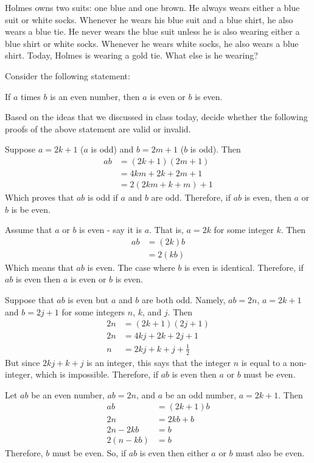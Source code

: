 \documentclass[11pt]{exam}
\begin{document}
\begin{center}
Holmes owns two suits: one blue and one brown.  He always wears either a blue suit or white socks.  Whenever he wears his blue suit and a blue shirt, he also wears a blue tie.  He never wears the blue suit unless he is also wearing either a blue shirt or white socks.  Whenever he wears white socks, he also wears a blue shirt.  Today, Holmes is wearing a gold tie.  What else is he wearing?
\end{center}
\newpage
Consider the following statement: 
\begin{center}
If $a$ times $b$ is an even number, then $a$ is even or $b$ is even.
\end{center}
Based on the ideas that we discussed in class today, decide whether the following proofs of the above statement are valid or invalid.
\begin{questions}
\question
Suppose $a=2k+1$ ($a$ is odd) and $b=2m+1$ ($b$ is odd). Then 
\begin{align*} 
ab &=(2k+1)(2m+1)\\
&=4km+2k+2m+1\\
&=2(2km+k+m)+1
\end{align*}
Which proves that $ab$ is odd if $a$ and $b$ are odd. Therefore, if $ab$ is even, then $a$ or $b$ is be even.
\vfill

\question
Assume that $a$ or $b$ is even - say it is $a$. That is, $a=2k$ for some integer $k$. Then 
\begin{align*} 
ab &=(2k)b\\
&=2(kb)
\end{align*} 
Which means that $ab$ is even.  The case where $b$ is even is identical.  Therefore, if $ab$ is even then $a$ is even or $b$ is even.
\vfill

\question
Suppose that $ab$ is even but $a$ and $b$ are both odd. Namely, $ab = 2n$, $a=2k+1$ and $b=2j+1$ for some integers $n$, $k$, and $j$. Then 
\begin{align*} 
2n &=(2k+1)(2j+1)\\
2n &=4kj+2k+2j+1\\
n &= 2kj+k+j+\frac{1}{2}
\end{align*}
But since $2kj+k+j$ is an integer, this says that the integer $n$ is equal to a non-integer, which is impossible.
Therefore, if $ab$ is even then $a$ or $b$ must be even.
\vfill

\question 
Let $ab$ be an even number, $ab=2n$, and $a$ be an odd number, $a=2k+1$. Then
\begin{align*} 
ab &=(2k+1)b\\
2n &=2kb+b\\
2n-2kb&=b\\
2(n-kb)&=b
\end{align*}
Therefore, $b$ must be even. So, if $ab$ is even then either $a$ or $b$ must also be even.
\end{questions}
\end{document}
